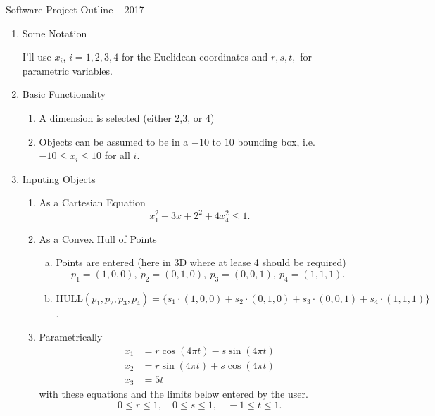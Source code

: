 \documentclass{article}
\begin{document}
\begin{center}
{\huge Software Project Outline -- 2017}
\end{center}

\bigskip
\begin{enumerate}[]
\item \begin{Large}{Some Notation}\end{Large}

I'll use $x_i$, $i=1,2,3,4$ for the Euclidean coordinates and $r,s,t,$ for parametric variables.
\item \begin{Large}Basic Functionality\end{Large}
\begin{enumerate}[1.]
\item A dimension is selected (either 2,3, or 4)
\item Objects can be assumed to be in a $-10$ to $10$ bounding box, i.e.$-10\le x_i\le 10$ for all $i$.
\end{enumerate}
\item \begin{Large}Inputing Objects\end{Large}
\begin{enumerate}[1.]
\item As a Cartesian Equation
\[
x_1^2+3x+2^2+4x_4^2\le 1.
\]
\item As a Convex Hull of Points
\begin{enumerate}[a.]
\item Points are entered (here in 3D where at lease 4 should be required)
\[
p_1=(1,0,0),\ p_2=(0,1,0),\ p_3=(0,0,1),\ p_4=(1,1,1).
\]
\item $\text{HULL}(p_1,p_2,p_3,p_4)=\{s_1\cdot(1,0,0)+s_2\cdot(0,1,0)+s_3\cdot(0,0,1)+s_4\cdot(1,1,1)\}$.
\end{enumerate}
\item Parametrically
\begin{align*}
x_1&=r\cos(4\pi t)-s\sin(4\pi t) \\
x_2&=r\sin(4\pi t)+s\cos(4\pi t) \\
x_3&=5t
\end{align*}
with these equations and the limits below entered by the user.
\[
0\le r\le 1,\quad 0\le s\le 1,\quad -1\le t\le 1.
\]


\end{enumerate}
\end{enumerate}
\end{document}
